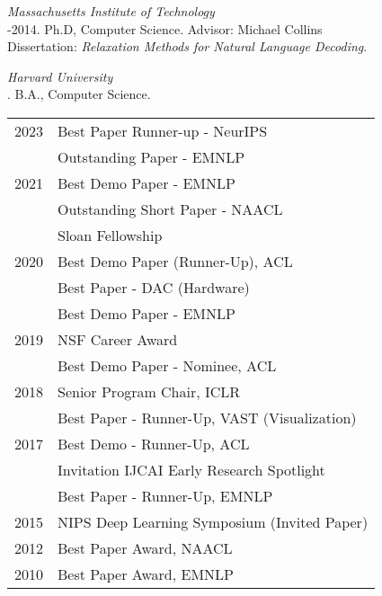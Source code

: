 \documentclass[10pt]{article}
\begin{document}
\noindent\emph{Massachusetts Institute of Technology \vspace{0.01in}}\\
-2014.  Ph.D, Computer Science. Advisor: Michael Collins\\
\ind Dissertation: \emph{Relaxation Methods for Natural Language Decoding}. %



\medskip
\noindent\emph{Harvard University\vspace{0.02in}}\\
. B.A., Computer Science.

\bigskip


\hspace{-1cm} \begin{tabular}{lp{11.5cm}}
	2023 & Best Paper Runner-up -  NeurIPS              \\
	     & Outstanding Paper -  EMNLP                   \\
	2021 & Best Demo Paper -  EMNLP                     \\
	     & Outstanding Short Paper -  NAACL             \\
	     & Sloan Fellowship                             \\
	2020 & Best Demo Paper (Runner-Up), ACL             \\
	     & Best Paper - DAC (Hardware)                  \\
	     & Best Demo Paper - EMNLP                      \\
	2019 & NSF Career Award                             \\
	     & Best Demo Paper - Nominee, ACL               \\
	2018 & Senior Program Chair, ICLR                   \\
	     & Best Paper - Runner-Up, VAST (Visualization) \\
	2017 & Best Demo  - Runner-Up, ACL                  \\
	     & Invitation IJCAI Early Research Spotlight    \\
	     & Best Paper - Runner-Up, EMNLP                \\
	2015 & NIPS Deep Learning Symposium (Invited Paper) \\
	2012 & Best Paper Award, NAACL                      \\
	2010 & Best Paper Award, EMNLP                      \\
\end{tabular}
\end{document}
